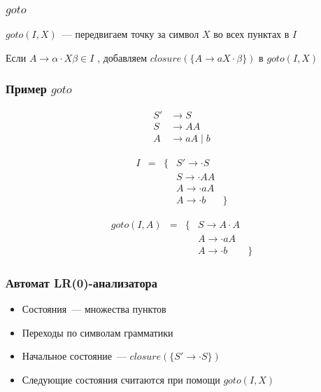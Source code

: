 \documentclass{beamer}
\newcommand{\lritem}[3]{#1 \to #2 \cdot #3}
\begin{document}
\begin{frame}[fragile]
  \transwipe[direction=90]
  \frametitle{$goto$}
  
  
  \begin{center}
    $goto(I, X)$~--- передвигаем точку за символ $X$ во всех пунктах в $I$
  \end{center}

  \begin{center}
    Если $\lritem{A}{\alpha}{X \beta} \in I$ , добавляем $closure(\{ \lritem{A}{aX}{\beta} \})$ в $goto(I, X)$
  \end{center}
\end{frame}


\begin{frame}[fragile]
  \transwipe[direction=90]
  \frametitle{Пример $goto$}
  
  \begin{align*}
    S' &\to S \\ 
    S  &\to A A \\ 
    A  &\to a A \mid b 
  \end{align*}

  \[
  \begin{array}{rcclr}
    I & = & \{ &\lritem{S'}{}{S} & \\
      &   &    &\lritem{S}{}{AA} & \\ 
      &   &    &\lritem{A}{}{aA} & \\ 
      &   &    &\lritem{A}{}{b}  &\}
  \end{array}  
  \]

  \[
  \begin{array}{rcclr}
    goto(I, A) & = & \{ & \lritem{S}{A}{A} & \\ 
               &   &    & \lritem{A}{}{aA} & \\ 
               &   &    & \lritem{A}{}{b}  & \}
  \end{array}
  \]

\end{frame}

\begin{frame}[fragile]
  \transwipe[direction=90]
  \frametitle{Автомат LR(0)-анализатора}
  \begin{itemize}
    \item Состояния~--- множества пунктов
    \item Переходы по символам грамматики 
    \item Начальное состояние~--- $closure(\{\lritem{S'}{}{S}\})$ 
    \item Следующие состояния считаются при помощи $goto(I, X)$
  \end{itemize}

\end{frame}
\end{document}
